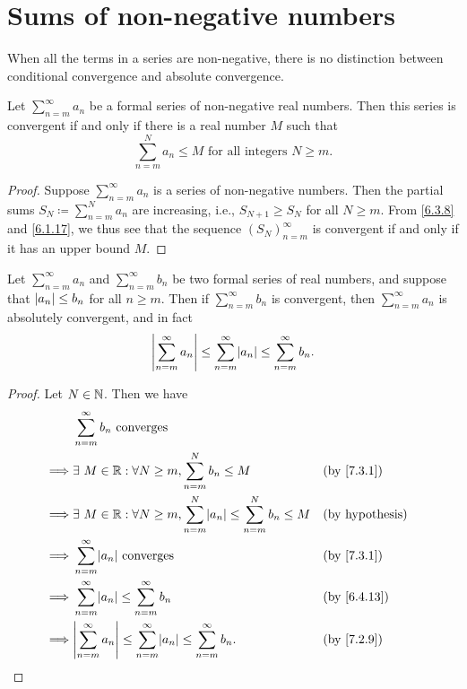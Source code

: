 \section{Sums of non-negative numbers}\label{sec:7.3}

\begin{note}
  When all the terms in a series are non-negative, there is no distinction between conditional convergence and absolute convergence.
\end{note}

\begin{prop}\label{7.3.1}
  Let \(\sum_{n = m}^\infty a_n\) be a formal series of non-negative real numbers.
  Then this series is convergent if and only if there is a real number \(M\) such that
  \[
    \sum_{n = m}^N a_n \leq M \text{ for all integers } N \geq m.
  \]
\end{prop}

\begin{proof}
  Suppose \(\sum_{n = m}^\infty a_n\) is a series of non-negative numbers.
  Then the partial sums \(S_N \coloneqq \sum_{n = m}^N a_n\) are increasing, i.e., \(S_{N + 1} \geq S_N\) for all \(N \geq m\).
  From \cref{6.3.8} and \cref{6.1.17}, we thus see that the sequence \((S_N)_{n = m}^\infty\) is convergent if and only if it has an upper bound \(M\).
\end{proof}

\begin{cor}\label{7.3.2}
  Let \(\sum_{n = m}^\infty a_n\) and \(\sum_{n = m}^\infty b_n\) be two formal series of real numbers, and suppose that \(\left\lvert a_n\right\rvert \leq b_n\) for all \(n \geq m\).
  Then if \(\sum_{n = m}^\infty b_n\) is convergent, then \(\sum_{n = m}^\infty a_n\) is absolutely convergent, and in fact
  \[
    \abs{\sum_{n = m}^\infty a_n} \leq \sum_{n = m}^\infty \abs{a_n} \leq \sum_{n = m}^\infty b_n.
  \]
\end{cor}

\begin{proof}
  Let \(N \in \mathbb{N}\).
  Then we have
  \begin{align*}
             & \sum_{n = m}^\infty b_n \text{ converges}                                                                                     \\
    \implies & \exists\ M \in \R : \forall N \geq m, \sum_{n = m}^N b_n \leq M                                &  & \text{(by \cref{7.3.1})}  \\
    \implies & \exists\ M \in \R : \forall N \geq m, \sum_{n = m}^N \abs{a_n} \leq \sum_{n = m}^N b_n \leq M  &  & \text{(by hypothesis)}    \\
    \implies & \sum_{n = m}^\infty \abs{a_n} \text{ converges}                                                &  & \text{(by \cref{7.3.1})}  \\
    \implies & \sum_{n = m}^\infty \abs{a_n} \leq \sum_{n = m}^\infty b_n                                     &  & \text{(by \cref{6.4.13})} \\
    \implies & \abs{\sum_{n = m}^\infty a_n} \leq \sum_{n = m}^\infty \abs{a_n} \leq \sum_{n = m}^\infty b_n. &  & \text{(by \cref{7.2.9})}
  \end{align*}
\end{proof}

